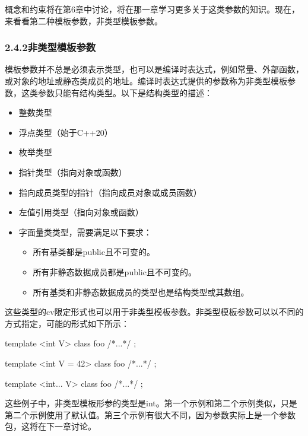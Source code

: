 概念和约束将在第6章中讨论，将在那一章学习更多关于这类参数的知识。现在，来看看第二种模板参数，非类型模板参数。


\subsubsection{2.4.2\hspace{0.2cm}非类型模板参数}

模板参数并不总是必须表示类型，也可以是编译时表达式，例如常量、外部函数，或对象的地址或静态类成员的地址。编译时表达式提供的参数称为非类型模板参数，这类参数只能有结构类型。以下是结构类型的描述：

\begin{itemize}
\item 
整数类型

\item 
浮点类型（始于C++20）

\item 
枚举类型

\item 
指针类型（指向对象或函数）

\item 
指向成员类型的指针（指向成员对象或成员函数）

\item 
左值引用类型（指向对象或函数）

\item 
字面量类类型，需要满足以下要求：
\begin{itemize}
\item 
所有基类都是public且不可变的。

\item 
所有非静态数据成员都是public且不可变的。

\item 
所有基类和非静态数据成员的类型也是结构类型或其数组。
\end{itemize}
\end{itemize}

这些类型的cv限定形式也可以用于非类型模板参数。非类型模板参数可以以不同的方式指定，可能的形式如下所示：

\begin{cpp}
template <int V>
class foo { /*...*/ };

template <int V = 42>
class foo { /*...*/ };

template <int... V>
class foo { /*...*/ };
\end{cpp}

这些例子中，非类型模板形参的类型是int。第一个示例和第二个示例类似，只是第二个示例使用了默认值。第三个示例有很大不同，因为参数实际上是一个参数包，这将在下一章讨论。

